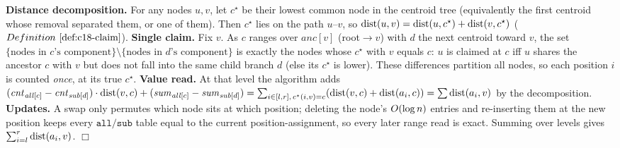 \begin{proofbox}
\textbf{Distance decomposition.} For any nodes \(u,v\), let \(c^\star\) be their lowest common node
in the centroid tree (equivalently the first centroid whose removal separated them, or one of them).
Then \(c^\star\) lies on the path \(u\)--\(v\), so \(\operatorname{dist}(u,v)=\operatorname{dist}(u,c^\star)+\operatorname{dist}(v,c^\star)\)
(\(\defref{c18-claim}\)). \textbf{Single claim.} Fix \(v\). As \(c\) ranges over \(\mathit{anc}[v]\)
(root\(\to v\)) with \(d\) the next centroid toward \(v\), the set \(\{\text{nodes in }c\text{'s
component}\}\setminus\{\text{nodes in }d\text{'s component}\}\) is exactly the nodes whose \(c^\star\)
with \(v\) equals \(c\): \(u\) is claimed at \(c\) iff \(u\) shares the ancestor \(c\) with \(v\) but
does not fall into the same child branch \(d\) (else its \(c^\star\) is lower). These differences
partition all nodes, so each position \(i\) is counted \emph{once}, at its true \(c^\star\).
\textbf{Value read.} At that level the algorithm adds
\((\mathit{cnt}_{\mathit{all}[c]}-\mathit{cnt}_{\mathit{sub}[d]})\cdot\operatorname{dist}(v,c)+
(\mathit{sum}_{\mathit{all}[c]}-\mathit{sum}_{\mathit{sub}[d]})
=\sum_{i\in[l,r],\,c^\star(i,v)=c}(\operatorname{dist}(v,c)+\operatorname{dist}(a_i,c))
=\sum \operatorname{dist}(a_i,v)\) by the decomposition. \textbf{Updates.} A swap only permutes which node sits at
which position; deleting the node's \(O(\log n)\) entries and re-inserting them at the new
position keeps every \(\texttt{all}/\texttt{sub}\) table equal to the current position-assignment, so
every later range read is exact. Summing over levels gives \(\sum_{i=l}^r\operatorname{dist}(a_i,v)\). \(\Box\)
\end{proofbox}

